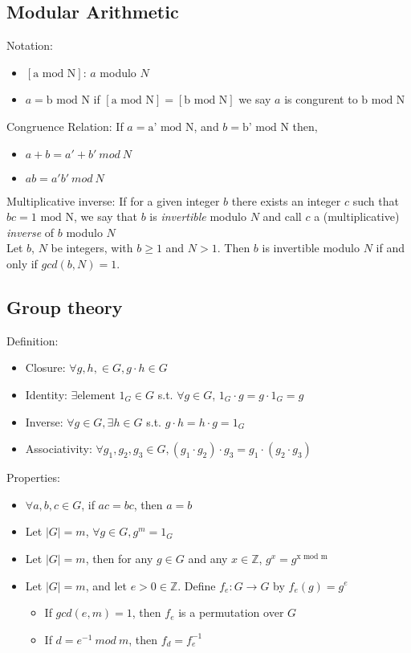 \subsection*{Modular Arithmetic}
Notation:
\begin{itemize}
    \item $[\text{a mod N}]$: $a$ modulo $N$
    \item $a=\text{b mod N}$ if $[\text{a mod N}]=[\text{b mod N}]$ 
    we say $a$ is congurent to $\text{b mod N}$
\end{itemize}
Congruence Relation: If $a=\text{a' mod N}$, and $b=\text{b' mod N}$ then,
\begin{itemize}
    \item $a+b=a'+b'\ mod\ N$
    \item $ab=a'b'\ mod\ N$
\end{itemize}
Multiplicative inverse: If for a given integer $b$ there exists an integer $c$ 
such that $bc = \text{1 mod N}$, we say that $b$ is \emph{invertible} 
modulo $N$ and call $c$ a (multiplicative) \emph{inverse} of $b$ modulo $N$\\

Let $b$, $N$ be integers, with $b \ge 1$ and $N > 1$. 
Then $b$ is invertible modulo $N$ if and only if $gcd(b, N ) = 1$.

\subsection*{Group theory}
Definition:
\begin{itemize}
    \item Closure: $\forall g,h, \in G, g\cdot h \in G$
    \item Identity: $\exists \text{element } 1_G \in G$ s.t. $\forall g\in G$,
    $1_G\cdot g=g\cdot 1_G=g$
    \item Inverse: $\forall g\in G,\exists h\in G$ s.t. $g\cdot h=h\cdot g=1_G$
    \item Associativity: $\forall g_1,g_2,g_3\in G,(g_1\cdot g_2)\cdot g_3=g_1\cdot(g_2\cdot g_3)$
\end{itemize}

Properties:
\begin{itemize}
    \item $\forall a,b,c \in G$, if $ac=bc$, then $a=b$
    \item Let $|G|=m$, $\forall g\in G,g^m=1_G$
    \item Let $|G|=m$, then for any $g\in G$ and any $x\in \mathbb{Z}$, 
    $g^x=g^{\text{x mod m}}$
    \item Let $|G|=m$, and let $e > 0 \in \mathbb{Z}$. Define
    $f_e: G \rightarrow G$ by $f_e(g)=g^e$
    \begin{itemize}
        \item If $gcd(e,m)=1$, then $f_e$ is a permutation over $G$
        \item If $d=e^{-1}\ mod\ m$, then $f_d=f_e^{-1}$
    \end{itemize}
\end{itemize}

